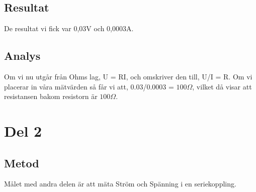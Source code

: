 \documentclass[11p]{article}
\begin{document}
    \subsection{Resultat}
    De resultat vi fick var 0,03V och 0,0003A.

    \subsection{Analys}
    Om vi nu utgår från Ohms lag, U = RI, och omskriver den till, U/I = R. Om vi placerar in våra mätvärden så får vi att, 0.03/0.0003 = $100\Omega$, vilket då visar att resistansen bakom resistorn är $100\Omega$.

    \section{Del 2}
    \subsection{Metod}
    Målet med andra delen är att mäta Ström och Spänning i en seriekoppling.
\end{document}
